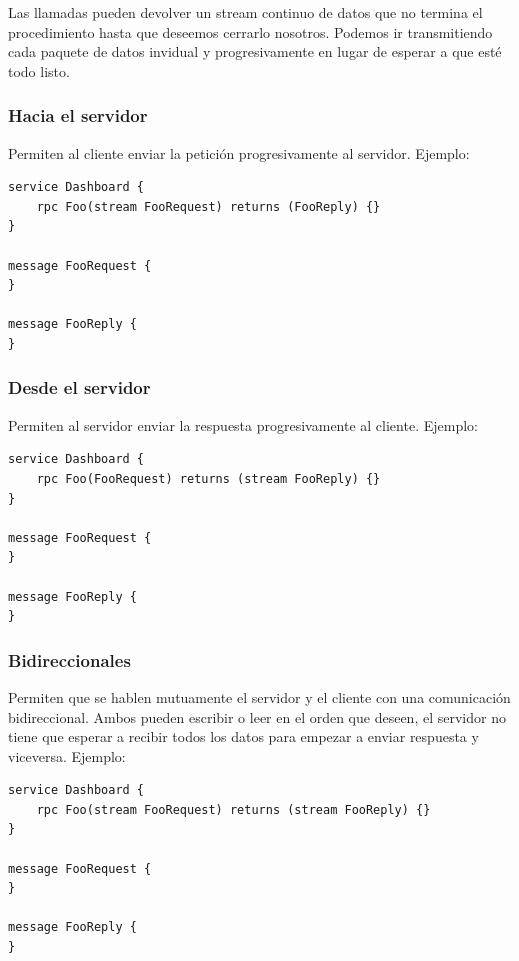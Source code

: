 Las llamadas pueden devolver un stream continuo de datos que no termina el procedimiento hasta que deseemos cerrarlo nosotros. Podemos ir transmitiendo cada paquete de datos invidual y progresivamente en lugar de esperar a que esté todo listo.

\subsubsection{Hacia el servidor}
\label{subsubsec:in-streaming}

Permiten al cliente enviar la petición progresivamente al servidor. Ejemplo:
\begin{verbatim}
service Dashboard {
    rpc Foo(stream FooRequest) returns (FooReply) {}
}

message FooRequest {
}

message FooReply {
}
\end{verbatim}

\subsubsection{Desde el servidor}
\label{subsubsec:out-streaming}

Permiten al servidor enviar la respuesta progresivamente al cliente. Ejemplo:
\begin{verbatim}
service Dashboard {
    rpc Foo(FooRequest) returns (stream FooReply) {}
}

message FooRequest {
}

message FooReply {
}
\end{verbatim}

\subsubsection{Bidireccionales}
\label{subsubsec:bi-streaming}

Permiten que se hablen mutuamente el servidor y el cliente con una comunicación bidireccional. Ambos pueden escribir o leer en el orden que deseen, el servidor no tiene que esperar a recibir todos los datos para empezar a enviar respuesta y viceversa. Ejemplo:
\begin{verbatim}
service Dashboard {
    rpc Foo(stream FooRequest) returns (stream FooReply) {}
}

message FooRequest {
}

message FooReply {
}
\end{verbatim}

